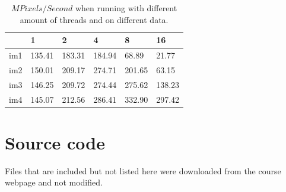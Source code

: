 \documentclass[a4paper,11pt]{article}
\begin{document}
\begin{table}[h!]
  \label{mpixelspersecond}
  \caption{$MPixels/Second$ when running with different amount of threads and on different data.}
  \begin{tabular}[h]{|l|l|l|l|l|l|}
    \hline
                  & 1     & 2     & 4     & 8     & 16\\
    \hline
    im1           & 135.41 & 183.31 & 184.94 & 68.89  & 21.77\\ 
    im2           & 150.01 & 209.17 & 274.71 & 201.65 & 63.15\\ 
    im3           & 146.25 & 209.72 & 274.44 & 275.62 & 138.23\\ 
    im4           & 145.07 & 212.56 & 286.41 & 332.90 & 297.42\\
    \hline
  \end{tabular}
\end{table}

\clearpage
\section{Source code}
Files that are included but not listed here were downloaded from the course webpage and not modified.


\clearpage

\clearpage

\end{document}
